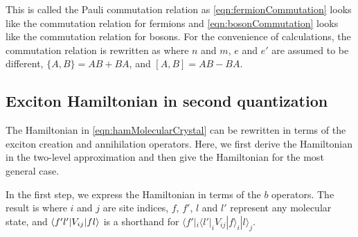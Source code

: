 This is called the Pauli commutation relation as \autoref{eqn:fermionCommutation} looks like the commutation relation for fermions  and \autoref{eqn:bosonCommutation} looks like the commutation relation for 
bosons. For the convenience
of calculations, the commutation relation is rewritten as
where $n$ and $m$, $e$ and $e'$ are assumed to be different, $\{ A, B\} = AB + BA$, and $[A, B] = AB - BA$. 

\subsection{Exciton Hamiltonian in second quantization}
\label{sec:excitonHam}

The Hamiltonian in \autoref{eqn:hamMolecularCrystal} can be rewritten in terms of the exciton creation and 
annihilation operators. Here, we first derive the Hamiltonian in the two-level approximation and then give
the Hamiltonian for the most general case.

In the first step, we express the Hamiltonian in terms of the $b$ operators. The result is\cite{zare-book}
where $i$ and $j$ are site indices, $f$, $f'$, $l$ and $l'$ represent any molecular state, and $\langle f' l' | V_{ij} | f l \rangle$ is a shorthand for $\langle f' |_{i} \langle l' |_{i}  V_{ij} | f\rangle_{i}  | l\rangle_{j}$. 

